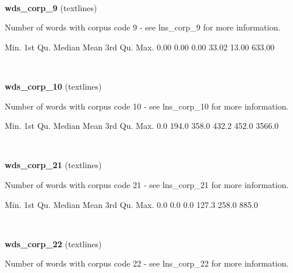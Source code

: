 \documentclass[]{article}
\newenvironment{Shaded}{\begin{snugshade}}{\end{snugshade}}
\newcommand{\FloatTok}[1]{\textcolor[rgb]{0.00,0.00,0.81}{{#1}}}
\newcommand{\NormalTok}[1]{{#1}}
\begin{document}
~

\vspace{1em}

\textbf{wds\_corp\_9} (textlines)

Number of words with corpus code 9 - see lns\_corp\_9 for more
information.

\begin{Shaded}
\begin{Highlighting}[]
   \NormalTok{Min. 1st Qu.  Median    Mean 3rd Qu.    Max. }
   \FloatTok{0.00}    \FloatTok{0.00}    \FloatTok{0.00}   \FloatTok{33.02}   \FloatTok{13.00}  \FloatTok{633.00} 
\end{Highlighting}
\end{Shaded}

~

\vspace{1em}

\textbf{wds\_corp\_10} (textlines)

Number of words with corpus code 10 - see lns\_corp\_10 for more
information.

\begin{Shaded}
\begin{Highlighting}[]
   \NormalTok{Min. 1st Qu.  Median    Mean 3rd Qu.    Max. }
    \FloatTok{0.0}   \FloatTok{194.0}   \FloatTok{358.0}   \FloatTok{432.2}   \FloatTok{452.0}  \FloatTok{3566.0} 
\end{Highlighting}
\end{Shaded}

~

\vspace{1em}

\textbf{wds\_corp\_21} (textlines)

Number of words with corpus code 21 - see lns\_corp\_21 for more
information.

\begin{Shaded}
\begin{Highlighting}[]
   \NormalTok{Min. 1st Qu.  Median    Mean 3rd Qu.    Max. }
    \FloatTok{0.0}     \FloatTok{0.0}     \FloatTok{0.0}   \FloatTok{127.3}   \FloatTok{258.0}   \FloatTok{885.0} 
\end{Highlighting}
\end{Shaded}

~

\vspace{1em}

\textbf{wds\_corp\_22} (textlines)

Number of words with corpus code 22 - see lns\_corp\_22 for more
information.
\end{document}
